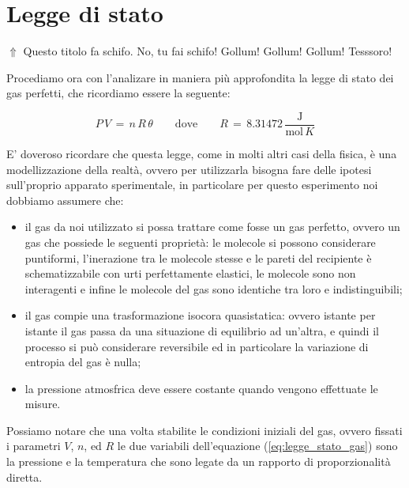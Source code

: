 \section{Legge di stato}

$\Uparrow$ Questo titolo fa schifo. No, tu fai schifo! Gollum! Gollum! Gollum! Tesssoro!
\bigskip

Procediamo ora con l'analizare in maniera più approfondita la legge di stato dei gas perfetti, che ricordiamo essere la seguente:

\begin{equation*}
	P \, V \,=\, n \, R \, \theta \quad\quad \text{dove} \quad\quad R \,=\, 8.31472 \, \frac{\text{J}}{\text{mol} \, K}
\end{equation*}

E' doveroso ricordare che questa legge, come in molti altri casi della fisica, è una modellizzazione della realtà, ovvero per utilizzarla bisogna fare delle ipotesi sull'proprio apparato sperimentale, in particolare per questo esperimento noi dobbiamo assumere che:

\begin{itemize}
	\item{il gas da noi utilizzato si possa trattare come fosse un gas perfetto, ovvero un gas che possiede le seguenti proprietà: le molecole si possono considerare puntiformi, l'inerazione tra le molecole stesse e le pareti del recipiente è schematizzabile con urti perfettamente elastici, le molecole sono non interagenti e infine le molecole del gas sono identiche tra loro e indistinguibili;}
	\item{il gas compie una trasformazione isocora quasistatica: ovvero istante per istante il gas passa da una situazione di equilibrio ad un'altra, e quindi il processo si può considerare reversibile ed in particolare la variazione di entropia del gas è nulla;}
	\item{la pressione atmosfrica deve essere costante quando vengono effettuate le misure.}
\end{itemize}
%
Possiamo notare che una volta stabilite le condizioni iniziali del gas, ovvero fissati i parametri $V$, $n$, ed $R$ le due variabili dell'equazione (\ref{eq:legge_stato_gas}) sono la pressione e la temperatura che sono legate da un rapporto di proporzionalità diretta. 
